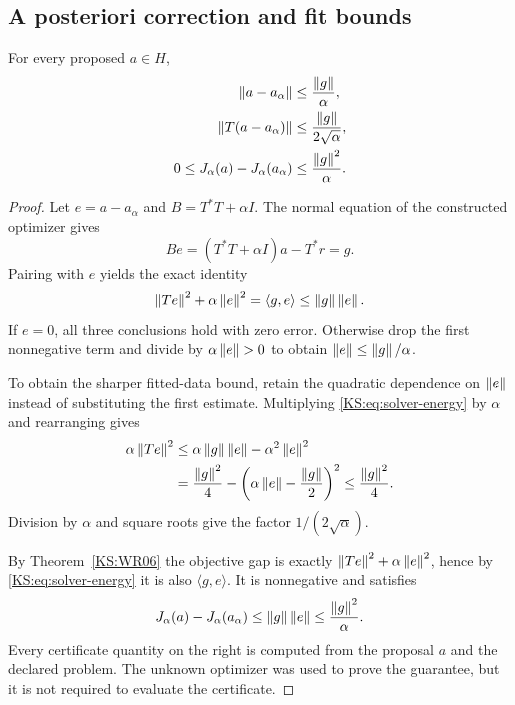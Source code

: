 \subsection{A posteriori correction and fit bounds}
\begin{KStheorem}\label{KS:WR13}
For every proposed $a\in H$,
\begin{align}
 \left\lVert a-a_\alpha\right\rVert&\le\frac{\left\lVert g\right\rVert}{\alpha},\label{KS:eq:solver-error}\\
 \left\lVert T(a-a_\alpha)\right\rVert&\le\frac{\left\lVert g\right\rVert}{2\sqrt\alpha},\label{KS:eq:solver-fit}\\
 0\le J_\alpha(a)-J_\alpha(a_\alpha)&\le\frac{\left\lVert g\right\rVert^2}{\alpha}.
 \label{KS:eq:solver-objective}
\end{align}
\end{KStheorem}
\begin{proof}
Let $e=a-a_\alpha$ and $B=T^*T+\alpha I$. The normal equation of the constructed optimizer gives
\[
 Be=(T^*T+\alpha I)a-T^*r=g.
\]
Pairing with $e$ yields the exact identity
\begin{equation}\label{KS:eq:solver-energy}
 \left\lVert Te\right\rVert^2+\alpha\left\lVert e\right\rVert^2=\langle g,e\rangle
 \le\left\lVert g\right\rVert\left\lVert e\right\rVert.
\end{equation}
If $e=0$, all three conclusions hold with zero error. Otherwise drop the first nonnegative term and divide by $\alpha\left\lVert e\right\rVert>0$ to obtain $\left\lVert e\right\rVert\le\left\lVert g\right\rVert/\alpha$.

To obtain the sharper fitted-data bound, retain the quadratic dependence on $\left\lVert e\right\rVert$ instead of substituting the first estimate. Multiplying \eqref{KS:eq:solver-energy} by $\alpha$ and rearranging gives
\[
\begin{aligned}
 \alpha\left\lVert Te\right\rVert^2
 &\le\alpha\left\lVert g\right\rVert\left\lVert e\right\rVert-\alpha^2\left\lVert e\right\rVert^2\\
 &=\frac{\left\lVert g\right\rVert^2}{4}
     -\left(\alpha\left\lVert e\right\rVert-\frac{\left\lVert g\right\rVert}{2}\right)^2
 \le\frac{\left\lVert g\right\rVert^2}{4}.
\end{aligned}
\]
Division by $\alpha$ and square roots give the factor $1/(2\sqrt\alpha)$.

By Theorem~\ref{KS:WR06} the objective gap is exactly $\left\lVert Te\right\rVert^2+\alpha\left\lVert e\right\rVert^2$, hence by \eqref{KS:eq:solver-energy} it is also $\langle g,e\rangle$. It is nonnegative and satisfies
\[
 J_\alpha(a)-J_\alpha(a_\alpha)
 \le\left\lVert g\right\rVert\left\lVert e\right\rVert\le\frac{\left\lVert g\right\rVert^2}{\alpha}.
\]
Every certificate quantity on the right is computed from the proposal $a$ and the declared problem. The unknown optimizer was used to prove the guarantee, but it is not required to evaluate the certificate.
\end{proof}

